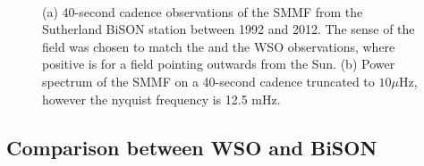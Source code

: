 \begin{figure}[ht!]
	\centering
	 \\ 
	\centering
	\caption{(a) 40-second cadence observations of the SMMF from the Sutherland BiSON station between 1992 and 2012. The sense of the field was chosen to match the \citet{chaplin_studies_2003} and the WSO observations, where positive is for a field pointing outwards from the Sun. (b) Power spectrum of the SMMF on a 40-second cadence truncated to $10 \mu\mathrm{Hz}$, however the nyquist frequency is 12.5 mHz.}  
	\label{fig:BiSON_SMMF}
\end{figure}


\subsection{Comparison between WSO and BiSON}

